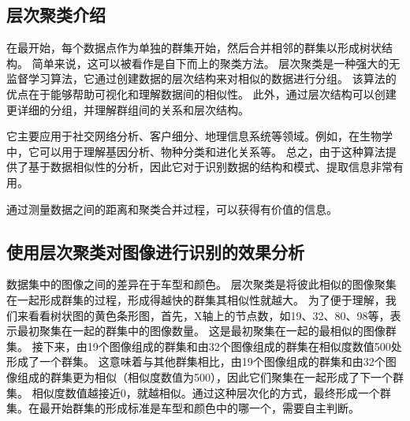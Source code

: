 \subsection{层次聚类介绍}
在最开始，每个数据点作为单独的群集开始，然后合并相邻的群集以形成树状结构。
简单来说，这可以被看作是自下而上的聚类方法。
层次聚类是一种强大的无监督学习算法，它通过创建数据的层次结构来对相似的数据进行分组。
该算法的优点在于能够帮助可视化和理解数据间的相似性。
此外，通过层次结构可以创建更详细的分组，并理解群组间的关系和层次结构。 \par

它主要应用于社交网络分析、客户细分、地理信息系统等领域。例如，在生物学中，它可以用于理解基因分析、物种分类和进化关系等。
总之，由于这种算法提供了基于数据相似性的分析，因此它对于识别数据的结构和模式、提取信息非常有用。 \par

通过测量数据之间的距离和聚类合并过程，可以获得有价值的信息。\par

\subsection{使用层次聚类对图像进行识别的效果分析}
\begin{figure}[H]
    \centering
    \quad
    \end{figure}

数据集中的图像之间的差异在于车型和颜色。
层次聚类是将彼此相似的图像聚集在一起形成群集的过程，形成得越快的群集其相似性就越大。
为了便于理解，我们来看看树状图的黄色条形图，首先，X轴上的节点数，如19、32、80、98等，表示最初聚集在一起的群集中的图像数量。
这是最初聚集在一起的最相似的图像群集。
接下来，由19个图像组成的群集和由32个图像组成的群集在相似度数值500处形成了一个群集。
这意味着与其他群集相比，由19个图像组成的群集和由32个图像组成的群集更为相似（相似度数值为500），因此它们聚集在一起形成了下一个群集。
相似度数值越接近0，就越相似。通过这种层次化的方式，最终形成一个群集。在最开始群集的形成标准是车型和颜色中的哪一个，需要自主判断。